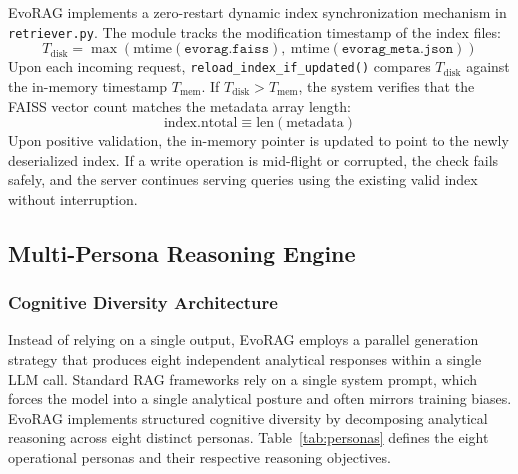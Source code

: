 EvoRAG implements a zero-restart dynamic index synchronization mechanism in \texttt{retriever.py}. The module tracks the modification timestamp of the index files:
\begin{equation}
T_{\text{disk}} = \max\left(\text{mtime}(\texttt{evorag.faiss}),\ \text{mtime}(\texttt{evorag\_meta.json})\right)
\end{equation}
Upon each incoming request, \texttt{reload\_index\_if\_updated()} compares $T_{\text{disk}}$ against the in-memory timestamp $T_{\text{mem}}$. If $T_{\text{disk}} > T_{\text{mem}}$, the system verifies that the FAISS vector count matches the metadata array length:
\begin{equation}
\text{index.ntotal} \equiv \text{len}(\text{metadata})
\end{equation}
Upon positive validation, the in-memory pointer is updated to point to the newly deserialized index. If a write operation is mid-flight or corrupted, the check fails safely, and the server continues serving queries using the existing valid index without interruption.

\subsection{Multi-Persona Reasoning Engine}
\label{subsec:persona_engine}

\subsubsection{Cognitive Diversity Architecture}
Instead of relying on a single output, EvoRAG employs a parallel generation strategy that produces eight independent analytical responses within a single LLM call. Standard RAG frameworks rely on a single system prompt, which forces the model into a single analytical posture and often mirrors training biases. EvoRAG implements structured cognitive diversity by decomposing analytical reasoning across eight distinct personas. Table~\ref{tab:personas} defines the eight operational personas and their respective reasoning objectives.

